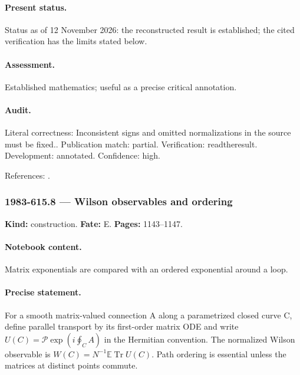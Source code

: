 \paragraph{Present status.} Status as of 12 November 2026: the reconstructed result is established; the cited verification has the limits stated below.

\paragraph{Assessment.} Established mathematics; useful as a precise critical annotation.

\paragraph{Audit.} Literal correctness: Inconsistent signs and omitted normalizations in the source must be fixed.. Publication match: partial. Verification: readtheresult. Development: annotated. Confidence: high.

\noindent References: \citep{brezinitzyksonparisizuber1978planar}.\par

\subsubsection{1983-615.8 --- Wilson observables and ordering}

\label{item:1983-615.8}

\noindent\textbf{Kind:} construction. \textbf{Fate:} E. \textbf{Pages:} 1143--1147.\par

\paragraph{Notebook content.} Matrix exponentials are compared with an ordered exponential around a loop.

\paragraph{Precise statement.} For a smooth matrix-valued connection A along a parametrized closed curve C, define parallel transport by its first-order matrix ODE and write $U(C)=\mathcal P\exp(i\oint_C A)$ in the Hermitian convention. The normalized Wilson observable is $W(C)=N^{-1}\mathbb E\operatorname{Tr}U(C)$. Path ordering is essential unless the matrices at distinct points commute.

